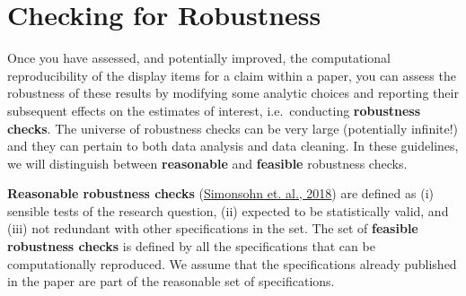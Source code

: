 \documentclass[]{book}
\begin{document}
\hypertarget{robust}{%
\chapter{Checking for Robustness}\label{robust}}

Once you have assessed, and potentially improved, the computational reproducibility of the display items for a claim within a paper, you can assess the robustness of these results by modifying some analytic choices and reporting their subsequent effects on the estimates of interest, i.e.~conducting \textbf{robustness checks}. The universe of robustness checks can be very large (potentially infinite!) and they can pertain to both data analysis and data cleaning. In these guidelines, we will distinguish between \textbf{reasonable} and \textbf{feasible} robustness checks.

\textbf{Reasonable robustness checks} (\href{https://urisohn.com/sohn_files/wp/wordpress/wp-content/uploads/Paper-Specification-curve-2018-11-02.pdf}{Simonsohn et. al., 2018}) are defined as (i) sensible tests of the research question, (ii) expected to be statistically valid, and (iii) not redundant with other specifications in the set. The set of \textbf{feasible robustness checks} is defined by all the specifications that can be computationally reproduced. We assume that the specifications already published in the paper are part of the reasonable set of specifications.
\end{document}
